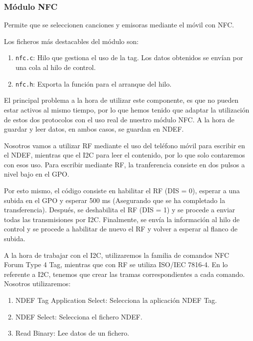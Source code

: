 \subsubsection{Módulo NFC}

Permite que se seleccionen canciones y emisoras mediante el móvil con NFC.


Los ficheros más destacables del módulo son:

\begin{enumerate}
	\item \texttt{nfc.c}: Hilo que gestiona el uso de la tag. Los datos obtenidos se envían por una cola al hilo de control.
	\item \texttt{nfc.h}: Exporta la función para el arranque del hilo.
\end{enumerate}

El principal problema a la hora de utilizar este componente, es que no pueden estar activos al mismo tiempo, por lo que hemos tenido que adaptar la utilización de estos dos protocolos con el uso real de nuestro módulo NFC. A la hora de guardar y leer datos, en ambos casos, se guardan en NDEF. 

Nosotros vamos a utilizar RF mediante el uso del teléfono móvil para escribir en el NDEF, mientras que el I2C para leer el contenido, por lo que solo contaremos con esos uso. Para escribir mediante RF, la tranferencia consiste en dos pulsos a nivel bajo en el GPO. 

Por esto mismo, el código consiste en habilitar el RF (DIS = 0), esperar a una subida en el GPO y esperar 500 ms (Asegurando que se ha completado la transferencia). Después, se deshabilita el RF (DIS = 1) y se procede a enviar todas las transmisiones por I2C. Finalmente, se envía la información al hilo de control y se procede a habilitar de nuevo el RF y volver a esperar al flanco de subida.

A la hora de trabajar con el I2C, utilizaremos la familia de comandos NFC Forum Type 4 Tag, mientras que con RF se utiliza ISO/IEC 7816-4. En lo referente a I2C, tenemos que crear las tramas correspondientes a cada comando. Nosotros utilizaremos:

\begin{enumerate}
    \item NDEF Tag Application Select: Selecciona la aplicación NDEF Tag.
    \item NDEF Select: Selecciona el fichero NDEF.
    \item Read Binary: Lee datos de un fichero.
\end{enumerate}

